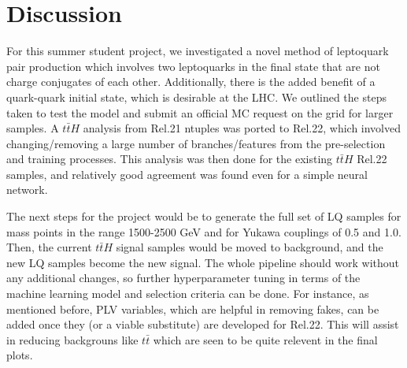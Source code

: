 \section{Discussion}
    For this summer student project, we investigated a novel method of leptoquark pair production which involves two leptoquarks in the final state that are not charge conjugates of each other. Additionally, there is the added benefit of a quark-quark initial state, which is desirable at the LHC. We outlined the steps taken to test the model and submit an official MC request on the grid for larger samples. A $t\bar{t}H$ analysis from Rel.21 ntuples was ported to Rel.22, which involved changing/removing a large number of branches/features from the pre-selection and training processes. This analysis was then done for the existing $t\bar{t}H$ Rel.22 samples, and relatively good agreement was found even for a simple neural network.
    
    The next steps for the project would be to generate the full set of LQ samples for mass points in the range 1500-2500 GeV and for Yukawa couplings of 0.5 and 1.0. Then, the current $t\bar{t}H$ signal samples would be moved to background, and the new LQ samples become the new signal. The whole pipeline should work without any additional changes, so further hyperparameter tuning in terms of the machine learning model and selection criteria can be done. For instance, as mentioned before, PLV variables, which are helpful in removing fakes, can be added once they (or a viable substitute) are developed for Rel.22. This will assist in reducing backgrouns like $t\bar{t}$ which are seen to be quite relevent in the final plots.